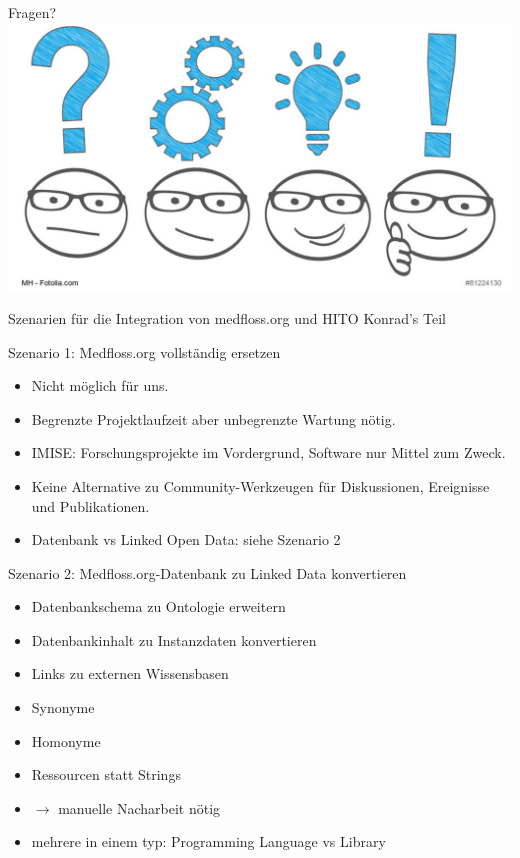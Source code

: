 \documentclass[aspectratio=1610,12pt]{beamer}
\begin{document}
\begin{frame}{Fragen?}
  \centering
  \vspace{-0.5cm}
  \includegraphics[width=\textwidth]{img/fragen.png}
\end{frame}

\begin{frame}{Szenarien für die Integration von medfloss.org und HITO}
  \centering
  \huge Konrad's Teil
\end{frame}

\begin{frame}{Szenario 1: Medfloss.org vollständig ersetzen}
\begin{itemize}
\item Nicht möglich für uns.
\item Begrenzte Projektlaufzeit aber unbegrenzte Wartung nötig.
\item IMISE: Forschungsprojekte im Vordergrund, Software nur Mittel zum Zweck.
\item Keine Alternative zu Community-Werkzeugen für Diskussionen, Ereignisse und Publikationen.
\item Datenbank vs Linked Open Data: siehe Szenario 2
\end{itemize}
\end{frame}

\begin{frame}{Szenario 2: Medfloss.org-Datenbank zu Linked Data konvertieren}
\begin{itemize}
\item Datenbankschema zu Ontologie erweitern
\item Datenbankinhalt zu Instanzdaten konvertieren
\item Links zu externen Wissensbasen
\item Synonyme
\item Homonyme
	\item Ressourcen statt Strings
\item $\rightarrow$ manuelle Nacharbeit nötig
\item mehrere in einem typ: Programming Language vs Library
\end{itemize}
\end{frame}
\end{document}
